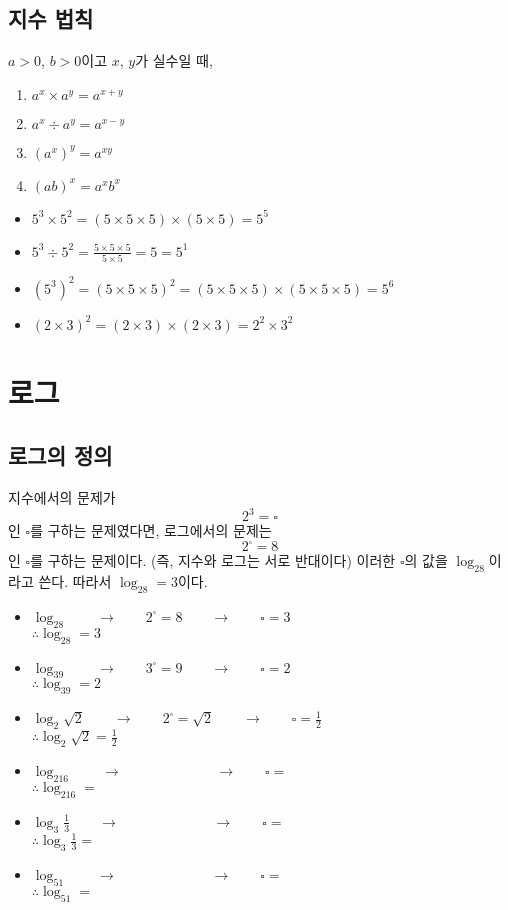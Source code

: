 \documentclass[a4paper,twocolumn]{article}
\begin{document}
%
\subsection{지수 법칙}
\(a>0\), \(b>0\)이고 \(x\), \(y\)가 실수일 때,
\begin{enumerate}[(1)]
\item
\(a^x\times a^y=a^{x+y}\)
\item
\(a^x\div a^y=a^{x-y}\)
\item
\((a^x)^y=a^{xy}\)
\item
\((ab)^x=a^xb^x\)
\end{enumerate}

\begin{itemize}
\item
\(5^3\times5^2=(5\times5\times5)\times(5\times5)=5^5\)
\item
\(5^3\div5^2=\frac{5\times5\times5}{5\times5}=5=5^1\)
\item
\((5^3)^2=(5\times5\times5)^2=(5\times5\times5)\times(5\times5\times5)=5^6\)
\item
\((2\times3)^2=(2\times3)\times(2\times3)=2^2\times3^2\)
\end{itemize}

\section{로그}

%
\subsection{로그의 정의}
지수에서의 문제가
\[2^3=\square\]
인 \(\square\)를 구하는 문제였다면, 로그에서의 문제는
\[2^\square=8\]
인 \(\square\)를 구하는 문제이다.
(즉, 지수와 로그는 서로 반대이다)
이러한 \(\square\)의 값을 \(\log_28\)이라고 쓴다.
따라서 \(\log_28=3\)이다.
\begin{itemize}
\item
\(\log_28\qquad\longrightarrow\qquad2^\square=8\qquad\longrightarrow\qquad\square=3\)\\[10pt]
\(\therefore\log_28=3\)
\item
\(\log_39\qquad\longrightarrow\qquad3^\square=9\qquad\longrightarrow\qquad\square=2\)\\[10pt]
\(\therefore\log_39=2\)
\item
\(\log_2\sqrt2\qquad\longrightarrow\qquad2^\square=\sqrt2\qquad\longrightarrow\qquad\square=\frac12\)\\[10pt]
\(\therefore\log_2\sqrt2=\frac12\)
\item
\(\log_216\qquad\longrightarrow\qquad\phantom{2^\square=8}\qquad\longrightarrow\qquad\square=\)\\[10pt]
\(\therefore\log_216=\)
\item
\(\log_3\frac13\qquad\longrightarrow\qquad\phantom{2^\square=8}\qquad\longrightarrow\qquad\square=\)\\[10pt]
\(\therefore\log_3\frac13=\)
\item
\(\log_51\qquad\longrightarrow\qquad\phantom{2^\square=8}\qquad\longrightarrow\qquad\square=\)\\[10pt]
\(\therefore\log_51=\)
\end{itemize}
\end{document}
